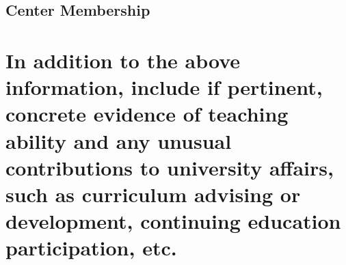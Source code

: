 \documentclass[11 pt]{rpibio}
\begin{document}
\subsection{Center Membership}


%
\section{In addition to the above information, include if pertinent, concrete evidence of teaching ability and any unusual contributions to university affairs, such as curriculum advising or development, continuing education participation, etc.}

\vspace{2em}
\noindent{}\hfill
{}

\clearpage
\end{document}

